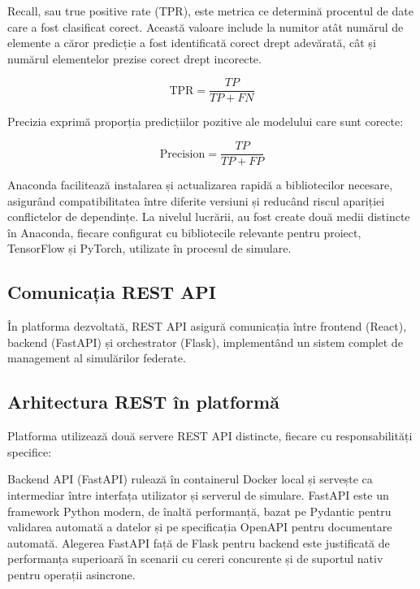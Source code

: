 \documentclass[../../main.tex]{subfiles}
\begin{document}
	        Recall, sau true positive rate (TPR), este metrica ce determină procentul de date care a fost clasificat corect. Această valoare include la numitor atât numărul de elemente a căror predicție a fost identificată corect drept adevărată, cât și numărul elementelor prezise corect drept incorecte.

\begin{equation}
\text{TPR} = \frac{TP}{TP + FN}
\end{equation}

        Precizia exprimă proporția predicțiilor pozitive ale modelului care sunt corecte:

\begin{equation}
\text{Precision} = \frac{TP}{TP + FP}
\end{equation}
    
Anaconda facilitează instalarea și actualizarea rapidă a bibliotecilor necesare, asigurând compatibilitatea între diferite versiuni și reducând riscul apariției conflictelor de dependințe. La nivelul lucrării, au fost create două medii distincte în Anaconda, fiecare configurat cu bibliotecile relevante pentru proiect, TensorFlow și PyTorch, utilizate în procesul de simulare.

    \subsection{Comunicația REST API}

    În platforma dezvoltată, REST API asigură comunicația între frontend (React), backend (FastAPI) și orchestrator (Flask), implementând un sistem complet de management al simulărilor federate.

	    \subsection{Arhitectura REST în platformă}

    Platforma utilizează două servere REST API distincte, fiecare cu responsabilități specifice:

	    Backend API (FastAPI) rulează în containerul Docker local și servește ca intermediar între interfața utilizator și serverul de simulare. FastAPI este un framework Python modern, de înaltă performanță, bazat pe Pydantic pentru validarea automată a datelor și pe specificația OpenAPI pentru documentare automată. Alegerea FastAPI față de Flask pentru backend este justificată de performanța superioară în scenarii cu cereri concurente și de suportul nativ pentru operații asincrone.
\end{document}
